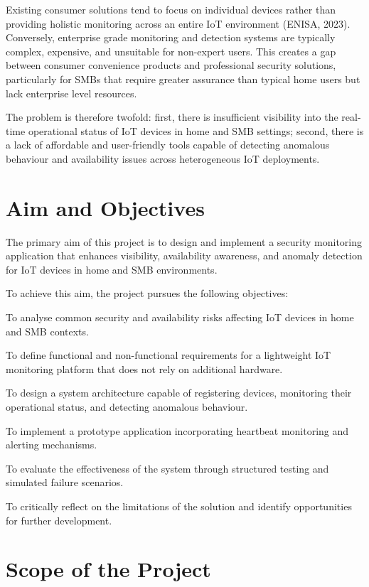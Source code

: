 Existing consumer solutions tend to focus on individual devices rather than providing holistic monitoring across an entire IoT environment (ENISA, 2023). Conversely, enterprise grade monitoring and detection systems are typically complex, expensive, and unsuitable for non-expert users. This creates a gap between consumer convenience products and professional security solutions, particularly for SMBs that require greater assurance than typical home users but lack enterprise level resources.

The problem is therefore twofold: first, there is insufficient visibility into the real-time operational status of IoT devices in home and SMB settings; second, there is a lack of affordable and user-friendly tools capable of detecting anomalous behaviour and availability issues across heterogeneous IoT deployments.

\section{Aim and Objectives}

The primary aim of this project is to design and implement a security monitoring application that enhances visibility, availability awareness, and anomaly detection for IoT devices in home and SMB environments.

To achieve this aim, the project pursues the following objectives:

To analyse common security and availability risks affecting IoT devices in home and SMB contexts.

To define functional and non-functional requirements for a lightweight IoT monitoring platform that does not rely on additional hardware.

To design a system architecture capable of registering devices, monitoring their operational status, and detecting anomalous behaviour.

To implement a prototype application incorporating heartbeat monitoring and alerting mechanisms.

To evaluate the effectiveness of the system through structured testing and simulated failure scenarios.

To critically reflect on the limitations of the solution and identify opportunities for further development.

\section{Scope of the Project}

